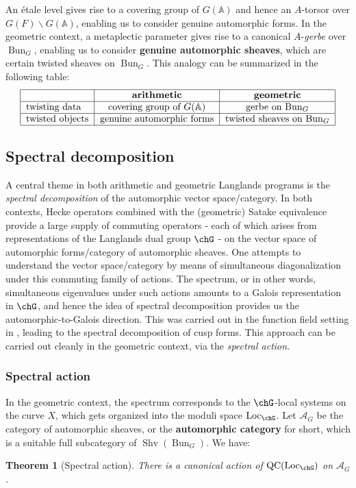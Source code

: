 \documentclass[10pt]{amsart}
\newcommand{\sssec}{\subsubsection}
\newtheorem{thm}[subsubsection]{Theorem}
\theoremstyle{remark}
\newcommand{\on}{\operatorname}
\newcommand{\cA}{\mathcal{A}}
\newcommand{\QC}{\on{QC}}
\newcommand{\Shv}{\on{Shv}}
\newcommand{\Loc}{\on{Loc}}
\newcommand{\Bun}{\on{Bun}}
\begin{document}
An \'etale level gives rise to a covering group of $G(\mathbb{A})$ and hence an $A$-torsor over $G(F)\backslash G(\mathbb{A})$, enabling us to consider genuine automorphic forms. In the geometric context, a metaplectic parameter gives rise to a canonical $A$-\emph{gerbe} over $\Bun_G$, enabling us to consider \textbf{genuine automorphic sheaves}, which are certain twisted sheaves on $\Bun_G$. This analogy can be summarized in the following table:
\[
\begin{tabular}{|l|c|c|}
\hline
               & \textbf{arithmetic}                        & \textbf{geometric}                   \\ \hline
               twisting data  & covering group of $G(\mathbb{A})$ & gerbe on $\Bun_G$           \\ \hline
twisted objects & genuine automorphic forms         & twisted sheaves on $\Bun_G$ \\ \hline

\end{tabular}
\]

\subsection{Spectral decomposition}
A central theme in both arithmetic and geometric Langlands programs is the \emph{spectral decomposition} of the automorphic vector space/category. In both contexts, Hecke operators combined with the (geometric) Satake equivalence provide a large supply of commuting operators - each of which arises from representations of the Langlands dual group $\chG$ - on the vector space of automorphic forms/category of automorphic sheaves. One attempts to understand the vector space/category by means of simultaneous diagonalization under this commuting family of actions. The spectrum, or in other words, simultaneous eigenvalues under such actions amounts to a Galois representation in $\chG$, and hence the idea of spectral decomposition provides us the automorphic-to-Galois direction. This was carried out in the function field setting in \cite{Laf}, leading to the spectral decomposition of cusp forms. This approach can be carried out cleanly in the geometric context, via the \emph{spectral action}.

\sssec{Spectral action}
In the geometric context, the spectrum corresponds to the $\chG$-local systems on the curve $X$, which gets organized into the moduli space $\Loc_{\chG}$. Let $\cA_G$ be the category of automorphic sheaves, or the \textbf{automorphic category} for short, which is a suitable full subcategory of $\Shv(\Bun_G)$.
We have:
\begin{thm}[Spectral action]\label{thm: spectral action non mp}
    There is a canonical action of $\QC(\Loc_{\chG})$ on $\cA_G$.
\end{thm}
\end{document}
